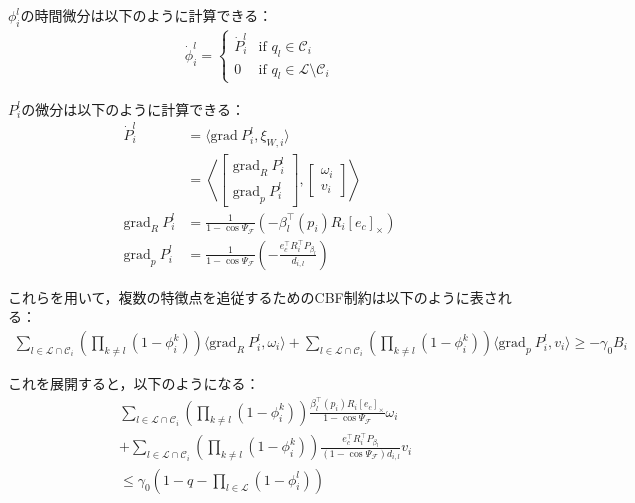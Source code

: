 $\phi_i^l$の時間微分は以下のように計算できる：
\begin{equation}
\begin{aligned}
\dot{\phi}_i^l = 
\begin{cases}
\dot{P}_i^l & \text{if } q_l \in \mathcal{C}_i \\
0 & \text{if } q_l \in \mathcal{L} \setminus \mathcal{C}_i
\end{cases}
\label{eq:multi_probability_derivative}
\end{aligned}
\end{equation}

$P_i^l$の微分は以下のように計算できる：
\begin{equation}
\begin{aligned}
\dot{P}_i^l &= \langle \mathrm{grad}\:P_i^l, \xi_{W,i} \rangle \\
&= \left\langle 
\begin{bmatrix}
\mathrm{grad}_R\:P_i^l \\
\mathrm{grad}_p\:P_i^l
\end{bmatrix},
\begin{bmatrix}
\omega_i \\
v_i
\end{bmatrix}
\right\rangle \\
\mathrm{grad}_R\:P_i^l &= \frac{1}{1 - \cos\Psi_{\mathcal{F}}}(-\beta_l^\top(p_i) R_i [e_c]_\times) \\
\mathrm{grad}_p\:P_i^l &= \frac{1}{1 - \cos\Psi_{\mathcal{F}}}\left(-\frac{e_c^\top R_i^\top P_{\beta_l}}{d_{i,l}}\right)
\label{eq:visibility_probability_derivative}
\end{aligned}
\end{equation}

これらを用いて，複数の特徴点を追従するためのCBF制約は以下のように表される：
\begin{equation}
\begin{aligned}
\sum_{l \in \mathcal{L} \cap \mathcal{C}_i}\left(\prod_{k \neq l}(1 - \phi_i^k)\right) \langle \mathrm{grad}_R\:P_i^l, \omega_i \rangle + \sum_{l \in \mathcal{L} \cap \mathcal{C}_i}\left(\prod_{k \neq l}(1 - \phi_i^k)\right) \langle \mathrm{grad}_p\:P_i^l, v_i \rangle \geq -\gamma_0 B_i
\label{eq:multi_cbf_constraint}
\end{aligned}
\end{equation}

これを展開すると，以下のようになる：
\begin{equation}
\begin{aligned}
&\sum_{l \in \mathcal{L} \cap \mathcal{C}_i}\left(\prod_{k \neq l}(1 - \phi_i^k)\right) \frac{\beta_l^\top(p_i) R_i [e_c]_\times}{1 - \cos\Psi_{\mathcal{F}}}\omega_i \\
&+ \sum_{l \in \mathcal{L} \cap \mathcal{C}_i}\left(\prod_{k \neq l}(1 - \phi_i^k)\right) \frac{e_c^\top R_i^\top P_{\beta_l}}{(1 - \cos\Psi_{\mathcal{F}})d_{i,l}}v_i \\
&\leq \gamma_0 \left(1 - q - \prod_{l \in \mathcal{L}}(1 - \phi_i^l)\right)
\label{eq:multi_cbf_constraint_expanded}
\end{aligned}
\end{equation}

